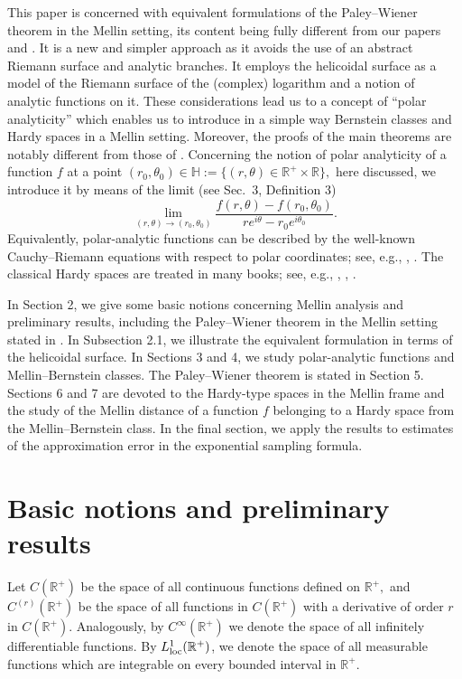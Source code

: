 \documentclass[amsmath,english,a4paper,graphicx,12pt]{article}
\begin{document}
This paper is concerned with equivalent formulations of the 
Paley--Wiener theorem in the Mellin setting, its content being fully 
different from our papers \cite{BBMS} and \cite{BBMS2}. It is a new and simpler 
approach as it avoids the use of an abstract Riemann surface and analytic 
branches. It employs the helicoidal surface as a model of the Riemann surface of the (complex) logarithm and a notion of  analytic functions on it.
These considerations lead us to a concept of ``polar analyticity'' which 
enables us to introduce in a simple way  Bernstein classes and  
Hardy spaces in a Mellin setting.  Moreover, the proofs of the main theorems are notably
different from those of \cite{BBMS}. Concerning the notion of polar analyticity of a function $f$ at a point 
$(r_0, \theta_0) \in \mathbb{H}:=\{(r,\theta) \in \mathbb{R^+}\times \mathbb{R}\},$ here discussed, we introduce it by means of the limit 
(see Sec.\ 3, Definition 3)
$$\lim_{(r,\theta) \rightarrow (r_0,\theta_0)} \frac{f(r, \theta) - f(r_0, \theta_0)}{re^{i\theta} - r_0e^{i\theta_0}}.$$
Equivalently, polar-analytic functions can be described by the well-known Cauchy--Riemann equations with respect to polar coordinates; 
see, e.g., \cite{NP}, \cite{CBV}. The classical Hardy spaces are treated in many books; see, e.g., \cite{RU}, \cite{RR}, \cite{FS}.

In Section 2, we give some basic notions concerning Mellin analysis and preliminary results, including the Paley--Wiener theorem in the Mellin 
setting stated in \cite{BBMS}. In  Subsection 2.1, we illustrate the equivalent formulation in terms of the helicoidal surface. In Sections 3 and 4, 
we study polar-analytic functions and Mellin--Bernstein classes. The Paley--Wiener theorem is stated in Section 5. Sections 6 and 7 are devoted 
to the Hardy-type spaces in the Mellin frame and the study of the Mellin distance of a function $f$ belonging to a Hardy space from the 
Mellin--Bernstein class. In the final section, we apply the results to estimates of the approximation error in the exponential sampling  formula. 



\section{\bf Basic notions and preliminary results}

Let $C(\mathbb{R}^+)$ be the space of all continuous functions defined on $\mathbb{R}^+,$ and $C^{(r)}(\mathbb{R}^+)$ be the space of all functions 
in $C(\mathbb{R}^+)$ with a derivative of order $r$ in $C(\mathbb{R}^+).$ Analogously, by $C^\infty(\mathbb{R}^+)$ we denote the space of all 
infinitely differentiable functions.
By $L^1_{\rm{loc}}(\mathbb{R}^+)$, we denote the space of all measurable functions which are integrable on every bounded interval in $\mathbb{R}^+.$
\end{document}
